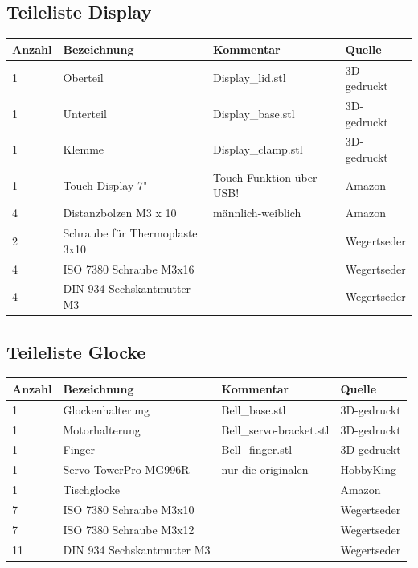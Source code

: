 \documentclass[12pt,letterpaper]{article}
\begin{document}
    \subsection{Teileliste Display}
    \begin{tabular}{|l|l|l|l|}
    \hline
        Anzahl & Bezeichnung & Kommentar & Quelle \\ \hline
        1 & Oberteil & Display\_lid.stl & 3D-gedruckt \\ \hline
        1 & Unterteil & Display\_base.stl & 3D-gedruckt \\ \hline
        1 & Klemme & Display\_clamp.stl & 3D-gedruckt \\ \hline
        1 & Touch-Display 7" & Touch-Funktion über USB! & Amazon \\ \hline
        4 & Distanzbolzen M3 x 10 & männlich-weiblich & Amazon \\ \hline
        2 & Schraube für Thermoplaste 3x10 & ~ & Wegertseder \\ \hline
        4 & ISO 7380 Schraube M3x16 & ~ & Wegertseder \\ \hline
        4 & DIN 934 Sechskantmutter M3 & ~ & Wegertseder \\ \hline
    \end{tabular}
    
    \subsection{Teileliste Glocke}
        \begin{tabular}{|l|l|l|l|}
    \hline
        Anzahl & Bezeichnung & Kommentar & Quelle \\ \hline
        1 & Glockenhalterung & Bell\_base.stl & 3D-gedruckt \\ \hline
        1 & Motorhalterung & Bell\_servo-bracket.stl & 3D-gedruckt \\ \hline
        1 & Finger & Bell\_finger.stl & 3D-gedruckt \\ \hline
        1 & Servo TowerPro MG996R & nur die originalen & HobbyKing \\ \hline
        1 & Tischglocke & ~ & Amazon \\ \hline
        7 & ISO 7380 Schraube M3x10 & ~ & Wegertseder \\ \hline
        7 & ISO 7380 Schraube M3x12 & ~ & Wegertseder \\ \hline
        11 & DIN 934 Sechskantmutter M3 & ~ & Wegertseder \\ \hline
    \end{tabular}
    
\end{document}
